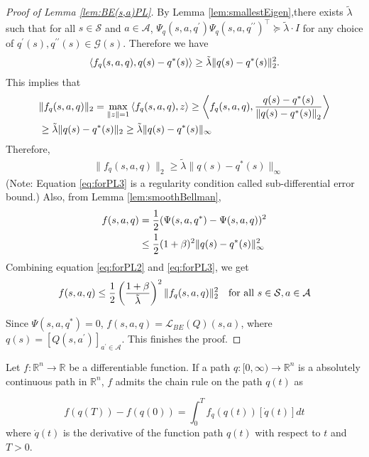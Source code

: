 \begin{proof}[Proof of Lemma \ref{lem:BE(s,a)PL}]
By Lemma \ref{lem:smallestEigen},there exists $\tilde{\lambda}$ such that for all $s\in\mathcal{S}$ and $a\in\mathcal{A}$, $\Psi_q(s, a, q^\prime) \Psi_q(s, a, q^{\prime\prime})^\top \succeq \tilde{\lambda} \cdot I$ for any choice of $q^\prime(s), q^{\prime\prime}(s) \in\mathcal{G}(s)$. %
Therefore we have
\begin{align}
    \left\langle f_q(s, a, q), q(s)-q^\ast(s)\right\rangle \ge \tilde{\lambda} \|q(s)-q^\ast(s)\|_2^2. \notag
\end{align}
This implies that
\begin{align}
    &\|f_q(s, a, q)\|_2=\max _{\|z\|=1}\left\langle f_q(s, a, q), z\right\rangle \ge \left\langle f_q(s,a,q), \frac{q(s)-q^*(s)}{\left\|q(s)-q^*(s)\right\|_2}\right\rangle \notag
    \\
    &\ge  \tilde{\lambda}\|q(s)-q^\ast(s)\|_2  \ge \tilde{\lambda}\|q(s)-q^\ast(s)\|_{\infty}  \label{eq:forPL1}
\end{align}
Therefore,
\begin{align}
    &\|f_q(s, a, q)\|_2\ge \tilde{\lambda}\|q(s)-q^\ast(s)\|_{\infty}   \label{eq:forPL3}
\end{align}
(Note: Equation \ref{eq:forPL3} is a regularity condition called sub-differential error bound.) Also, from Lemma \ref{lem:smoothBellman}, 
\begin{align}
    f(s, a, q) &= \frac{1}{2}(\Psi(s, a, q^\ast)-\Psi(s, a, q))^2\notag
    \\
    &\le \frac{1}{2} (1+\beta)^2 \|q(s)-q^\ast(s)\|_{\infty}^2\label{eq:forPL2}
\end{align}
Combining equation \ref{eq:forPL2} and \ref{eq:forPL3}, we get \begin{align}
  f(s,a,q)\le \frac{1}{2} \left(\frac{1+\beta}{\tilde{\lambda}}\right)^2 \|f_q(s, a, q)\|_2^2 \quad\text{for all }s\in\mathcal{S}, a\in\mathcal{A} \notag
\end{align}

Since $\Psi\left(s, a, q^*\right)=0$, $f(s,a,q) = \mathcal{L}_{BE}(Q)(s,a)$, where $q(s)=\left[Q\left(s, a^{\prime}\right)\right]_{a^{\prime} \in \mathcal{A}}$. This finishes the proof.

\end{proof}
\begin{thm}\label{thm:bolte}
Let $f:\mathbb{R}^n \rightarrow \mathbb{R}$ be a differentiable function. If a path $q:[0, \infty) \rightarrow \mathbb{R}^n$ is a absolutely continuous path in $\mathbb{R}^n$, $f$ admits the chain rule on the path $q(t)$ as

$$
f(q(T))-f(q(0))=\int_0^T f_q(q(t))[\dot{q}(t)] d t
$$
where $\dot{q}(t)$ is the derivative of the function path $q(t)$ with respect to $t$ and $T>0$.
\end{thm}


